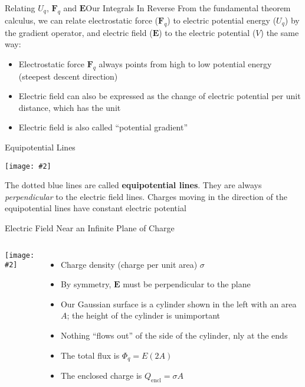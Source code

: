 \documentclass[12pt,aspectratio=169]{beamer}
\newcommand{\pic}[2]{\texttt{[image: \#2]}}
\newcommand{\mb}[1]{\mathbf{#1}}
\newcommand{\eq}[2]{\vspace{#1}{
    \Large\begin{displaymath}#2\end{displaymath}}
}
\begin{document}
\begin{frame}{Relating $U_q$, $\mb{F}_q$ and $\mb{E}$}{Our Integrals In Reverse}
  From the fundamental theorem calculus, we can relate electrostatic force
  ($\mb{F}_q$) to electric potential energy ($U_q$) by the gradient operator,
  and electric field ($\mb{E}$) to the electric potential ($V$) the same way:

  \eq{-.2in}{
    \mb{F}_q=-\nabla U_q=-\frac{\partial U_q}{\partial r}\hat{\mb{r}}
    \quad\;\;
    \mb{E}=-\nabla V=-\frac{\partial V}{\partial r}\hat{\mb{r}}
  }
  \begin{itemize}  
  \item Electrostatic force $\mb{F}_q$ always points from high to
    low potential energy (steepest descent direction)
  \item Electric field can also be expressed as the change of electric
    potential per unit distance, which has the unit
    
    \eq{-.2in}{
      \SI{1}{\newton\per\coulomb}=\SI{1}{\volt\per\metre}
    }
  \item Electric field is also called ``potential gradient''
  \end{itemize}
\end{frame}



\begin{frame}{Equipotential Lines}
  \begin{center}
    \pic{0.65}{plate3.png}
  \end{center}
  The dotted blue lines are called \textbf{equipotential lines}. They are
  always \emph{perpendicular} to the electric field lines. Charges moving in
  the direction of the equipotential lines have constant electric potential
\end{frame}



\begin{frame}{Electric Field Near an Infinite Plane of Charge}
  \begin{columns}
    \pic{1.1}{elec_gauss_figure9.png}

    \begin{itemize}
    \item Charge density (charge per unit area) $\sigma$
    \item By symmetry, $\mb{E}$ must be perpendicular to the plane
    \item Our Gaussian surface is a cylinder shown in the left with an area
      $A$; the height of the cylinder is unimportant
    \item Nothing ``flows out'' of the side of the cylinder, nly at the ends
    \item The total flux is $\Phi_q=E(2A)$
    \item The enclosed charge is $Q_\mathrm{encl}=\sigma A$
    \end{itemize}
  \end{columns}
\end{frame}
\end{document}
